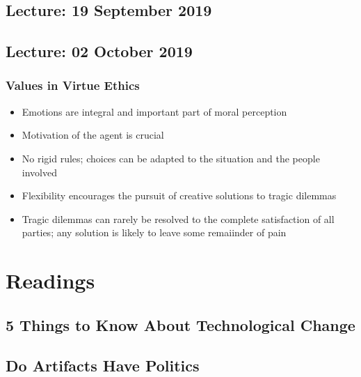 \documentclass[11pt]{article}
\begin{document}
\subsection{Lecture: 19 September 2019}
\subsection{Lecture: 02 October 2019}
\subsubsection{Values in Virtue Ethics}
\begin{itemize}
\item Emotions are integral and important part of moral perception
\item Motivation of the agent is crucial
\item No rigid rules; choices can be adapted to the situation and the people involved
\item Flexibility encourages the pursuit of creative solutions to tragic dilemmas
\item Tragic dilemmas can rarely be resolved to the complete satisfaction of all parties; any solution is likely to leave some remaiinder of pain

\end{itemize}
\pagebreak
\section{Readings}
\subsection{5 Things to Know About Technological Change}
\subsection{Do Artifacts Have Politics}
\end{document}
